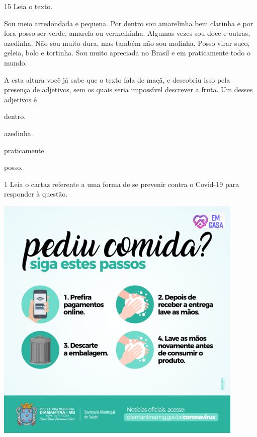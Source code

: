 \num{15} Leia o texto.

\begin{myquote}
Sou meio arredondada e pequena. Por dentro sou amarelinha bem clarinha e
por fora posso ser verde, amarela ou vermelhinha. Algumas vezes sou doce
e outras, azedinha. Não sou muito dura, mas também não sou molinha.
Posso virar suco, geleia, bolo e tortinha. Sou muito apreciada no Brasil
e em praticamente todo o mundo.

\end{myquote}

A esta altura você já sabe que o texto fala de maçã, e descobriu isso
pela presença de adjetivos, sem os quais seria impossível descrever a
fruta. Um desses adjetivos é

\begin{escolha}
\item dentro.

\item azedinha.

\item praticamente.

\item posso.
\end{escolha}

\pagebreak
\vspace*{-3.4cm}
\pagebreak


\num{1} Leia o cartaz referente a uma forma de se prevenir contra o Covid-19
para responder à questão.
\vspace{2ex}

\begin{center}
\includegraphics[width=.9\textwidth]{./media/image36.png}
\end{center}

